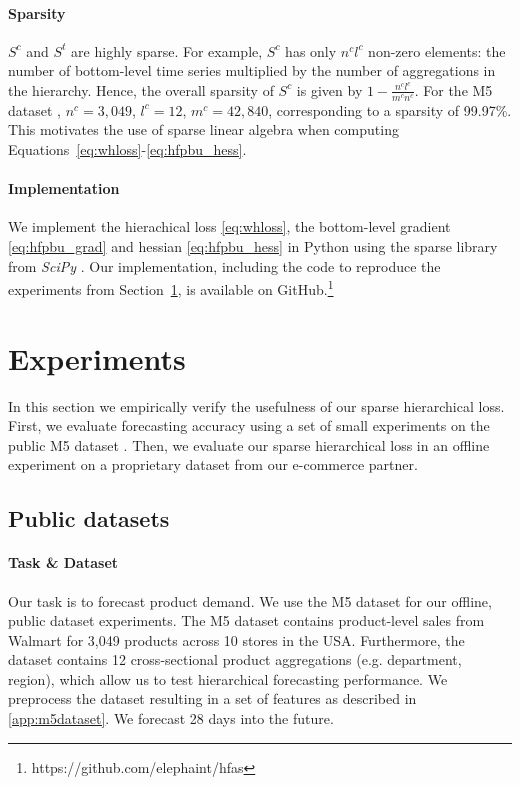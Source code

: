 \documentclass[preprint, 3p, times, twocolumn]{elsarticle}
\begin{document}
\paragraph{Sparsity} \(S^c\) and \(S^t\) are highly sparse. For example, \(S^c\) has only \(n^cl^c\) non-zero elements: the number of bottom-level time series multiplied by the number of aggregations in the hierarchy. Hence, the overall sparsity of \(S^c\) is given by \( 1 - \frac{n^cl^c}{m^cn^c} \). For the M5 dataset \cite{makridakis_m5_2021}, \(n^c = 3,049\), \(l^c = 12\), \(m^c=42,840\), corresponding to a sparsity of 99.97\%. This motivates the use of sparse linear algebra when computing Equations~\eqref{eq:whloss}-\eqref{eq:hfpbu_hess}.

\paragraph{Implementation} We implement the hierachical loss \eqref{eq:whloss}, the bottom-level gradient \eqref{eq:hfpbu_grad} and hessian \eqref{eq:hfpbu_hess} in Python using the sparse library from \textit{SciPy} \cite{virtanen_scipy_2020}. Our implementation, including the code to reproduce the experiments from Section~\ref{sec:experiments}, is available on GitHub.\footnote{https://github.com/elephaint/hfas}

\section{Experiments}
  \label{sec:experiments}
  In this section we empirically verify the usefulness of our sparse hierarchical loss. First, we evaluate forecasting accuracy using a set of small experiments on the public M5 dataset \cite{makridakis_m5_2021}. Then, we evaluate our sparse hierarchical loss in an offline experiment on a proprietary dataset from our e-commerce partner.

  \subsection{Public datasets} \label{subsec:publicdatasets}
  \paragraph{Task \& Dataset} Our task is to forecast product demand. We use the M5 dataset \cite{makridakis_m5_2021} for our offline, public dataset experiments. The M5 dataset contains product-level sales from Walmart for 3,049 products across 10 stores in the USA. Furthermore, the dataset contains 12 cross-sectional product aggregations (e.g. department, region), which allow us to test hierarchical forecasting performance. We preprocess the dataset resulting in a set of features as described in \ref{app:m5dataset}. We forecast 28 days into the future.
  
\end{document}
